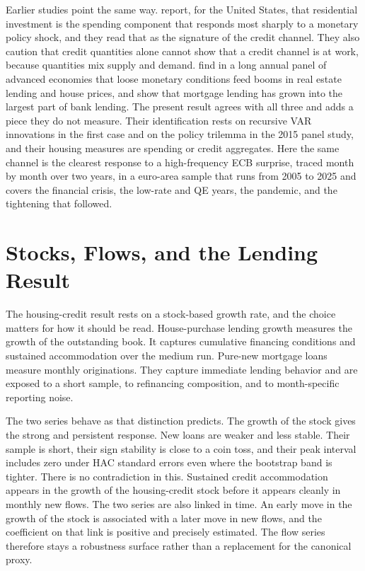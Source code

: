 Earlier studies point the same way. \textcite{BernankeGertler1995} report, for the United States, that residential investment is the spending component that responds most sharply to a monetary policy shock, and they read that as the signature of the credit channel. They also caution that credit quantities alone cannot show that a credit channel is at work, because quantities mix supply and demand. \textcite{JordaSchularickTaylor2015} find in a long annual panel of advanced economies that loose monetary conditions feed booms in real estate lending and house prices, and \textcite{JordaSchularickTaylor2016} show that mortgage lending has grown into the largest part of bank lending. The present result agrees with all three and adds a piece they do not measure. Their identification rests on recursive VAR innovations in the first case and on the policy trilemma in the 2015 panel study, and their housing measures are spending or credit aggregates. Here the same channel is the clearest response to a high-frequency ECB surprise, traced month by month over two years, in a euro-area sample that runs from 2005 to 2025 and covers the financial crisis, the low-rate and QE years, the pandemic, and the tightening that followed.

\section{Stocks, Flows, and the Lending Result}

The housing-credit result rests on a stock-based growth rate, and the choice matters for how it should be read. House-purchase lending growth measures the growth of the outstanding book. It captures cumulative financing conditions and sustained accommodation over the medium run. Pure-new mortgage loans measure monthly originations. They capture immediate lending behavior and are exposed to a short sample, to refinancing composition, and to month-specific reporting noise.

The two series behave as that distinction predicts. The growth of the stock gives the strong and persistent response. New loans are weaker and less stable. Their sample is short, their sign stability is close to a coin toss, and their peak interval includes zero under HAC standard errors even where the bootstrap band is tighter. There is no contradiction in this. Sustained credit accommodation appears in the growth of the housing-credit stock before it appears cleanly in monthly new flows. The two series are also linked in time. An early move in the growth of the stock is associated with a later move in new flows, and the coefficient on that link is positive and precisely estimated. The flow series therefore stays a robustness surface rather than a replacement for the canonical proxy.

